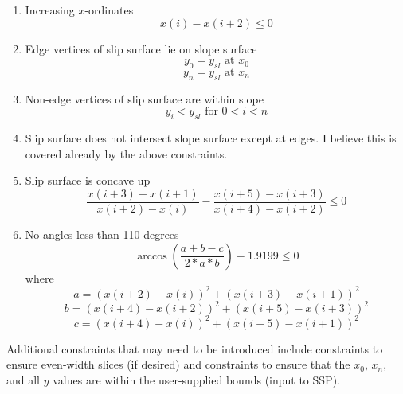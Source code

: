 \documentclass[12pt]{article}
\begin{document}
\begin{enumerate}
	\item Increasing $x$-ordinates
	\begin{equation*}
	x(i) - x(i + 2) \leq 0
	\end{equation*}
	
	\item Edge vertices of slip surface lie on slope surface
	\begin{equation*}
	y_0 = y_{sl} \text{ at } x_0
	\end{equation*}
	\begin{equation*}
	y_n = y_{sl} \text{ at } x _n
	\end{equation*}
	
	\item Non-edge vertices of slip surface are within slope
	\begin{equation*}
	y_i < y_{sl} \text{ for } 0 < i < n
	\end{equation*}
	
	\item Slip surface does not intersect slope surface except at edges. I 
	believe this is covered already by the above constraints.
	
	\item Slip surface is concave up
	\begin{equation*}
	\frac{x(i+3) - x(i+1)}{x(i+2) - x(i)} - \frac{x(i+5) - x(i+3)}{x(i+4) - 
	x(i+2)} \leq 0
	\end{equation*}
	
	\item No angles less than 110 degrees
	\begin{equation*}
	\arccos\left(\frac{a + b - c}{2*a*b}\right) - 1.9199 \leq 0
	\end{equation*}
	where
	\begin{equation*}
	a = (x(i+2) - x(i))^2 + (x(i+3) - x(i+1))^2
	\end{equation*}
	\begin{equation*}
	b = (x(i+4) - x(i+2))^2 + (x(i+5) - x(i+3))^2
	\end{equation*}
	\begin{equation*}
	c = (x(i+4) - x(i))^2 + (x(i+5) - x(i+1))^2
	\end{equation*}
\end{enumerate}

Additional constraints that may need to be introduced include constraints to 
ensure even-width slices (if desired) and constraints to ensure that the $x_0$, 
$x_n$, and all $y$ values are within the user-supplied bounds (input to SSP).
\end{document}
